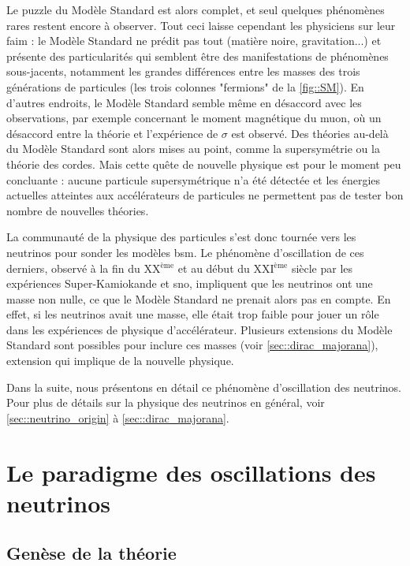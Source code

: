       Le puzzle du Modèle Standard est alors complet, et seul quelques phénomènes rares restent encore à observer. Tout ceci laisse cependant les physiciens sur leur faim : le Modèle Standard ne prédit pas tout (matière noire, gravitation...) et présente des particularités qui semblent être des manifestations de phénomènes sous-jacents, notamment les grandes différences entre les masses des trois générations de particules (les trois colonnes "fermions" de la \autoref{fig::SM}). En d'autres endroits, le Modèle Standard semble même en désaccord avec les observations, par exemple concernant le moment magnétique du muon, où un désaccord entre la théorie et l'expérience de $\sigma$ est observé\cite{pdg2018}. Des théories au-delà du Modèle Standard sont alors mises au point, comme la supersymétrie ou la théorie des cordes\cite{pdg2018}. Mais cette quête de nouvelle physique est pour le moment peu concluante : aucune particule supersymétrique n'a été détectée et les énergies actuelles atteintes aux accélérateurs de particules ne permettent pas de tester bon nombre de nouvelles théories.

      La communauté de la physique des particules s'est donc tournée vers les neutrinos pour sonder les modèles \gls{bsm}. Le phénomène d'oscillation de ces derniers, observé à la fin du XX$^{\text{ème}}$ et au début du XXI$^{\text{ème}}$ siècle par les expériences Super-Kamiokande\cite{Fukuda1998} et \gls{sno}\cite{Aharmim2013}, impliquent que les neutrinos ont une masse non nulle, ce que le Modèle Standard ne prenait alors pas en compte. En effet, si les neutrinos avait une masse, elle était trop faible pour jouer un rôle dans les expériences de physique d'accélérateur.  Plusieurs extensions du Modèle Standard sont possibles pour inclure ces masses (voir \autoref{sec::dirac_majorana}), extension qui implique de la nouvelle physique.

      Dans la suite, nous présentons en détail ce phénomène d'oscillation des neutrinos. Pour plus de détails sur la physique des neutrinos en général, voir \autoref{sec::neutrino_origin} à \autoref{sec::dirac_majorana}.

  \section{Le paradigme des oscillations des neutrinos}

    \subsection{Genèse de la théorie}

